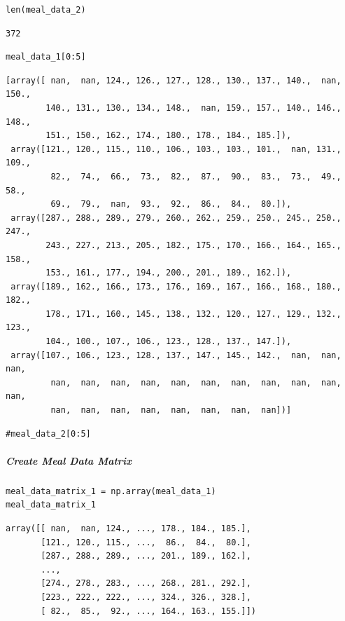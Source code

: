 \begin{verbatim}
len(meal_data_2)
\end{verbatim}

\begin{verbatim}
372
\end{verbatim}

\begin{verbatim}
meal_data_1[0:5]
\end{verbatim}

\begin{verbatim}
[array([ nan,  nan, 124., 126., 127., 128., 130., 137., 140.,  nan, 150.,
        140., 131., 130., 134., 148.,  nan, 159., 157., 140., 146., 148.,
        151., 150., 162., 174., 180., 178., 184., 185.]),
 array([121., 120., 115., 110., 106., 103., 103., 101.,  nan, 131., 109.,
         82.,  74.,  66.,  73.,  82.,  87.,  90.,  83.,  73.,  49.,  58.,
         69.,  79.,  nan,  93.,  92.,  86.,  84.,  80.]),
 array([287., 288., 289., 279., 260., 262., 259., 250., 245., 250., 247.,
        243., 227., 213., 205., 182., 175., 170., 166., 164., 165., 158.,
        153., 161., 177., 194., 200., 201., 189., 162.]),
 array([189., 162., 166., 173., 176., 169., 167., 166., 168., 180., 182.,
        178., 171., 160., 145., 138., 132., 120., 127., 129., 132., 123.,
        104., 100., 107., 106., 123., 128., 137., 147.]),
 array([107., 106., 123., 128., 137., 147., 145., 142.,  nan,  nan,  nan,
         nan,  nan,  nan,  nan,  nan,  nan,  nan,  nan,  nan,  nan,  nan,
         nan,  nan,  nan,  nan,  nan,  nan,  nan,  nan])]
\end{verbatim}

\begin{verbatim}
#meal_data_2[0:5]
\end{verbatim}

\subparagraph{Create Meal Data Matrix}

\begin{verbatim}
meal_data_matrix_1 = np.array(meal_data_1)
meal_data_matrix_1
\end{verbatim}

\begin{verbatim}
array([[ nan,  nan, 124., ..., 178., 184., 185.],
       [121., 120., 115., ...,  86.,  84.,  80.],
       [287., 288., 289., ..., 201., 189., 162.],
       ...,
       [274., 278., 283., ..., 268., 281., 292.],
       [223., 222., 222., ..., 324., 326., 328.],
       [ 82.,  85.,  92., ..., 164., 163., 155.]])
\end{verbatim}

